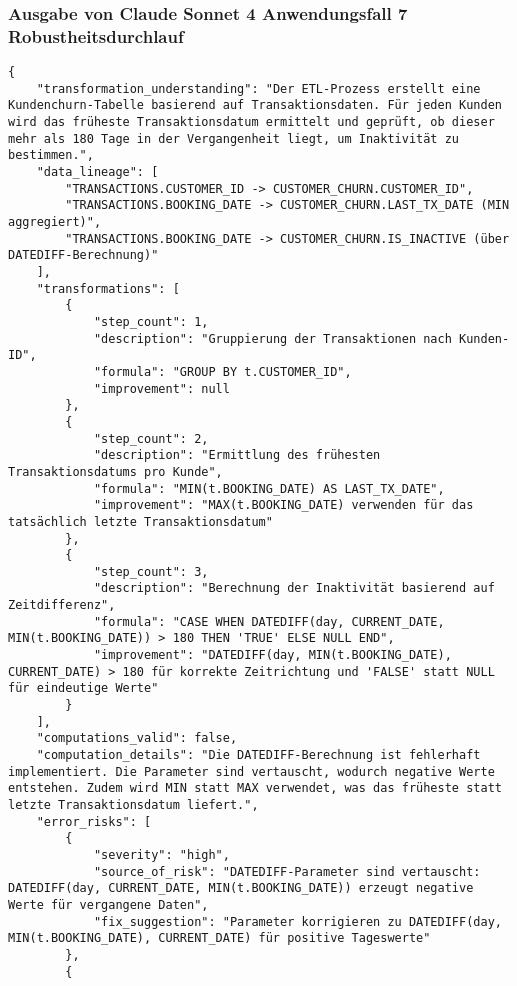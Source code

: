 \subsubsection{Ausgabe von Claude Sonnet 4 Anwendungsfall 7 Robustheitsdurchlauf}\label{anhang:subsubsec:claude_case7_prompt3}
\begin{lstlisting}[caption={Ausgabe: Claude Sonnet 4 Anwendungsfall 7 Robustheitsdurchlauf},label={claude_case7_prompt3}]
{
    "transformation_understanding": "Der ETL-Prozess erstellt eine Kundenchurn-Tabelle basierend auf Transaktionsdaten. Für jeden Kunden wird das früheste Transaktionsdatum ermittelt und geprüft, ob dieser mehr als 180 Tage in der Vergangenheit liegt, um Inaktivität zu bestimmen.",
    "data_lineage": [
        "TRANSACTIONS.CUSTOMER_ID -> CUSTOMER_CHURN.CUSTOMER_ID",
        "TRANSACTIONS.BOOKING_DATE -> CUSTOMER_CHURN.LAST_TX_DATE (MIN aggregiert)",
        "TRANSACTIONS.BOOKING_DATE -> CUSTOMER_CHURN.IS_INACTIVE (über DATEDIFF-Berechnung)"
    ],
    "transformations": [
        {
            "step_count": 1,
            "description": "Gruppierung der Transaktionen nach Kunden-ID",
            "formula": "GROUP BY t.CUSTOMER_ID",
            "improvement": null
        },
        {
            "step_count": 2,
            "description": "Ermittlung des frühesten Transaktionsdatums pro Kunde",
            "formula": "MIN(t.BOOKING_DATE) AS LAST_TX_DATE",
            "improvement": "MAX(t.BOOKING_DATE) verwenden für das tatsächlich letzte Transaktionsdatum"
        },
        {
            "step_count": 3,
            "description": "Berechnung der Inaktivität basierend auf Zeitdifferenz",
            "formula": "CASE WHEN DATEDIFF(day, CURRENT_DATE, MIN(t.BOOKING_DATE)) > 180 THEN 'TRUE' ELSE NULL END",
            "improvement": "DATEDIFF(day, MIN(t.BOOKING_DATE), CURRENT_DATE) > 180 für korrekte Zeitrichtung und 'FALSE' statt NULL für eindeutige Werte"
        }
    ],
    "computations_valid": false,
    "computation_details": "Die DATEDIFF-Berechnung ist fehlerhaft implementiert. Die Parameter sind vertauscht, wodurch negative Werte entstehen. Zudem wird MIN statt MAX verwendet, was das früheste statt letzte Transaktionsdatum liefert.",
    "error_risks": [
        {
            "severity": "high",
            "source_of_risk": "DATEDIFF-Parameter sind vertauscht: DATEDIFF(day, CURRENT_DATE, MIN(t.BOOKING_DATE)) erzeugt negative Werte für vergangene Daten",
            "fix_suggestion": "Parameter korrigieren zu DATEDIFF(day, MIN(t.BOOKING_DATE), CURRENT_DATE) für positive Tageswerte"
        },
        {

\end{lstlisting}
